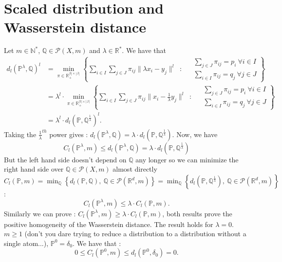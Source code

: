 \documentclass{amsart}
\newcommand{\RR}{\mathbb{R}}
\begin{document}
\section{Scaled distribution and Wasserstein distance}
\label{scaled}
 Let $m\in\mathbb{N}^*$, $\mathbb{Q}\in\mathcal{P}(X,m) $ and $\lambda\in\RR^*$. We have that
\begin{align*}
    d_l(\mathbb{P}^\lambda,\mathbb{Q})^l&=\min_{\pi\in\mathbb{R_+^{|I|\times|J|}}}\left\{ 
\sum_{i\in I}\sum_{j\in J}\pi_{ij}\lVert\lambda x_i-y_j\rVert^l \: \text{ : } \:  \begin{aligned}
& \sum_{j\in J}\pi_{ij}=p_i \: \forall i\in I \\
& \sum_{i\in I}\pi_{ij}=q_j \: \forall j\in J
\end{aligned}\right\} \\&=\lambda^l\cdot\min_{\pi\in\mathbb{R_+^{|I|\times|J|}}}\left\{ 
\sum_{i\in I}\sum_{j\in J}\pi_{ij}\lVert x_i-\frac{1}{\lambda}y_j\rVert^l \: \text{ : } \:  \begin{aligned}
& \sum_{j\in J}\pi_{ij}=p_i \: \forall i\in I \\
& \sum_{i\in I}\pi_{ij}=q_j \: \forall j\in J
\end{aligned}\right\} \\
&=\lambda^l \cdot d_l(\mathbb{P},\mathbb{Q}^{\frac{1}{\lambda}})^l.
\end{align*}
Taking the $\frac{1}{\lambda}^{th}$ power gives :  $d_l(\mathbb{P}^\lambda,\mathbb{Q})=\lambda\cdot d_l(\mathbb{P},\mathbb{Q}^{\frac{1}{\lambda}})$. Now, we have $$C_l(\mathbb{P}^\lambda,m)\leq d_l(\mathbb{P}^\lambda,\mathbb{Q})=\lambda\cdot d_l(\mathbb{P},\mathbb{Q}^{\frac{1}{\lambda}})$$
But the left hand side doesn't depend on $\mathbb{Q}$ any longer so we can minimize the right hand side over $\mathbb{Q}\in\mathcal{P}(X,m)$ almost directly $C_l(\mathbb{P},m)=\min_\mathbb{Q}\left\{d_l(\mathbb{P},\mathbb{Q}),\: \mathbb{Q}\in\mathcal{P}(\mathbb{R}^d,m)\right\}=\min_\mathbb{Q}\left\{d_l(\mathbb{P},\mathbb{Q}^\frac{1}{\lambda}),\: \mathbb{Q}\in\mathcal{P}(\mathbb{R}^d,m)\right\}$ :
$$
C_l(\mathbb{P}^\lambda,m)\leq \lambda\cdot C_l(\mathbb{P},m).
$$
Similarly we can prove : $C_l(\mathbb{P}^\lambda,m)\geq \lambda\cdot C_l(\mathbb{P},m)$, both results prove the positive homogeneity of the Wasserstein distance.
The result holds for $\lambda=0$. $m\geq 1$ (don't you dare trying to reduce a distribution to a distribution without a single atom...), $\mathbb{P}^0=\delta_0$. We have that : $$0\leq C_l(\mathbb{P}^0,m)\leq d_l(\mathbb{P}^0,\delta_0)=0.$$
\end{document}
